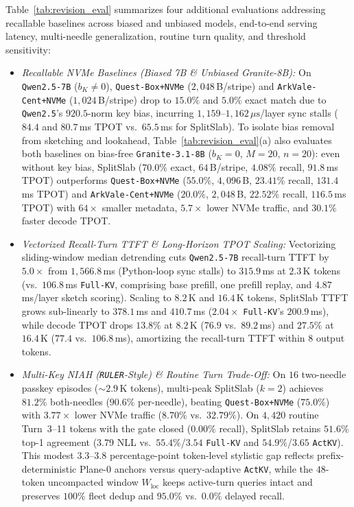 \documentclass[10pt,journal,compsoc]{IEEEtran}
\theoremstyle{definition}
\theoremstyle{remark}
\newcommand{\SplitSlab}{\textup{\textsc{SplitSlab}}}
\def\SplitSlab{SplitSlab}%
\begin{document}
Table~\ref{tab:revision_eval} summarizes four additional evaluations addressing recallable baselines across biased and unbiased models, end-to-end serving latency, multi-needle generalization, routine turn quality, and threshold sensitivity:
\begin{itemize}
  \item \emph{Recallable NVMe Baselines (Biased 7B \& Unbiased Granite-8B):} On \texttt{Qwen2.5-7B} ($b_K{\neq}0$), \texttt{Quest-Box+NVMe} ($2{,}048$\,B/stripe) and \texttt{ArkVale-Cent+NVMe} ($1{,}024$\,B/stripe) drop to $15.0\%$ and $5.0\%$ exact match due to \texttt{Qwen2.5}'s $920.5$-norm key bias, incurring $1{,}159$--$1{,}162\,\mu\mathrm{s}$/layer sync stalls ($84.4$ and $80.7$\,ms TPOT vs.\ $65.5$\,ms for \SplitSlab{}). To isolate bias removal from sketching and lookahead, Table~\ref{tab:revision_eval}(a) also evaluates both baselines on bias-free \texttt{Granite-3.1-8B} ($b_K{=}0$, $M{=}20$, $n{=}20$): even without key bias, \SplitSlab{} ($70.0\%$ exact, $64$\,B/stripe, $4.08\%$ recall, $91.8$\,ms TPOT) outperforms \texttt{Quest-Box+NVMe} ($55.0\%$, $4{,}096$\,B, $23.41\%$ recall, $131.4$\,ms TPOT) and \texttt{ArkVale-Cent+NVMe} ($20.0\%$, $2{,}048$\,B, $22.52\%$ recall, $116.5$\,ms TPOT) with $64\times$ smaller metadata, $5.7\times$ lower NVMe traffic, and $30.1\%$ faster decode TPOT.
  \item \emph{Vectorized Recall-Turn TTFT \& Long-Horizon TPOT Scaling:} Vectorizing sliding-window median detrending cuts \texttt{Qwen2.5-7B} recall-turn TTFT by $5.0\times$ from $1{,}566.8$\,ms (Python-loop sync stalls) to $315.9$\,ms at $2.3$\,K tokens (vs.\ $106.8$\,ms \texttt{Full-KV}, comprising base prefill, one prefill replay, and $4.87$\,ms/layer sketch scoring). Scaling to $8.2$\,K and $16.4$\,K tokens, \SplitSlab{} TTFT grows sub-linearly to $378.1$\,ms and $410.7$\,ms ($2.04\times$ \texttt{Full-KV}'s $200.9$\,ms), while decode TPOT drops $13.8\%$ at $8.2$\,K ($76.9$ vs.\ $89.2$\,ms) and $27.5\%$ at $16.4$\,K ($77.4$ vs.\ $106.8$\,ms), amortizing the recall-turn TTFT within $8$ output tokens.
  \item \emph{Multi-Key NIAH (\texttt{RULER}-Style) \& Routine Turn Trade-Off:} On $16$ two-needle passkey episodes ($\sim\!2.9$\,K tokens), multi-peak \SplitSlab{} ($k{=}2$) achieves $81.2\%$ both-needles ($90.6\%$ per-needle), beating \texttt{Quest-Box+NVMe} ($75.0\%$) with $3.77\times$ lower NVMe traffic ($8.70\%$ vs.\ $32.79\%$). On $4{,}420$ routine Turn~3--11 tokens with the gate closed ($0.00\%$ recall), \SplitSlab{} retains $51.6\%$ top-1 agreement ($3.79$ NLL vs.\ $55.4\%$/$3.54$ \texttt{Full-KV} and $54.9\%$/$3.65$ \texttt{ActKV}). This modest $3.3$--$3.8$ percentage-point token-level stylistic gap reflects prefix-deterministic Plane-0 anchors versus query-adaptive \texttt{ActKV}, while the $48$-token uncompacted window $W_{\mathrm{loc}}$ keeps active-turn queries intact and preserves $100\%$ fleet dedup and $95.0\%$ vs.\ $0.0\%$ delayed recall.

\end{itemize}
\end{document}
